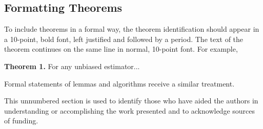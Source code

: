 \documentclass[]{spie}  %
\begin{document}
\subsection{Formatting Theorems}

To include theorems in a formal way, the theorem identification should appear in a 10-point, bold font, left justified and followed by a period.  The text of the theorem continues on the same line in normal, 10-point font.  For example, 

\noindent\textbf{Theorem 1.} For any unbiased estimator...

Formal statements of lemmas and algorithms receive a similar treatment.

\acknowledgments %

This unnumbered section is used to identify those who have aided the authors in understanding or accomplishing the work presented and to acknowledge sources of funding.  

\end{document}
